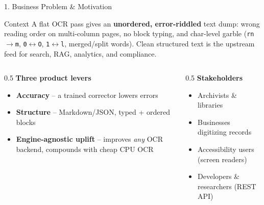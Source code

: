 \documentclass[10pt,aspectratio=169]{beamer}
\begin{document}
\begin{frame}{1. Business Problem \& Motivation}
\begin{block}{Context}
A flat OCR pass gives an \textbf{unordered, error-riddled} text dump: wrong reading order on multi-column pages, no block typing, and char-level garble (\texttt{rn$\rightarrow$m}, \texttt{0$\leftrightarrow$O}, \texttt{1$\leftrightarrow$l}, merged/split words). Clean structured text is the upstream feed for search, RAG, analytics, and compliance.
\end{block}

\begin{columns}[T]
\begin{column}{0.5\textwidth}
\textbf{Three product levers}
\begin{itemize}
  \item \textbf{Accuracy} -- a trained corrector lowers errors
  \item \textbf{Structure} -- Markdown/JSON, typed + ordered blocks
  \item \textbf{Engine-agnostic uplift} -- improves \emph{any} OCR backend, compounds with cheap CPU OCR
\end{itemize}
\end{column}
\begin{column}{0.5\textwidth}
\textbf{Stakeholders}
\begin{itemize}
  \item Archivists \& libraries
  \item Businesses digitizing records
  \item Accessibility users (screen readers)
  \item Developers \& researchers (REST API)
\end{itemize}
\end{column}
\end{columns}
\end{frame}
\end{document}
